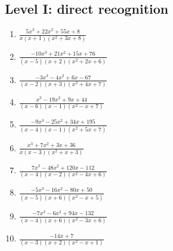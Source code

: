 \documentclass[11pt,oneside]{book}
\begin{document}
\subsection*{Level I: direct recognition}
\begin{enumerate}[leftmargin=*,label=\textbf{\arabic*.},itemsep=0.65\baselineskip]
\item $\displaystyle \frac{5 x^{3} + 22 x^{2} + 55 x + 8}{x \left(x + 1\right) \left(x^{2} + 3 x + 8\right)}$
\item $\displaystyle \frac{- 10 x^{3} + 21 x^{2} + 15 x + 76}{\left(x - 5\right) \left(x + 2\right) \left(x^{2} + 2 x + 6\right)}$
\item $\displaystyle \frac{- 3 x^{3} - 4 x^{2} + 6 x - 67}{\left(x - 2\right) \left(x + 3\right) \left(x^{2} + 4 x + 7\right)}$
\item $\displaystyle \frac{x^{3} - 19 x^{2} + 9 x + 44}{\left(x - 6\right) \left(x - 1\right) \left(x^{2} - x + 7\right)}$
\item $\displaystyle \frac{- 9 x^{3} - 25 x^{2} + 34 x + 195}{\left(x - 4\right) \left(x - 1\right) \left(x^{2} + 5 x + 7\right)}$
\item $\displaystyle \frac{x^{3} + 7 x^{2} + 3 x + 36}{x \left(x - 3\right) \left(x^{2} + x + 3\right)}$
\item $\displaystyle \frac{7 x^{3} - 48 x^{2} + 120 x - 112}{\left(x - 4\right) \left(x - 2\right) \left(x^{2} - 4 x + 6\right)}$
\item $\displaystyle \frac{- 5 x^{3} - 16 x^{2} - 80 x + 50}{\left(x - 5\right) \left(x + 6\right) \left(x^{2} - x + 5\right)}$
\item $\displaystyle \frac{- 7 x^{3} - 6 x^{2} + 94 x - 132}{\left(x - 4\right) \left(x + 6\right) \left(x^{2} - 3 x + 6\right)}$
\item $\displaystyle \frac{- 14 x + 7}{\left(x - 3\right) \left(x + 2\right) \left(x^{2} - x + 1\right)}$
\end{enumerate}
\end{document}
